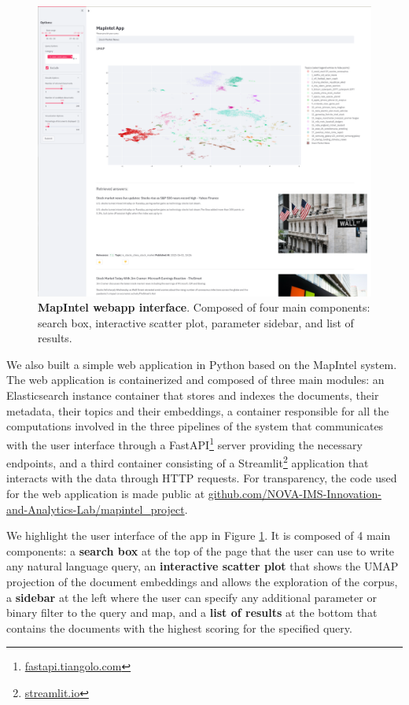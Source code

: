 \documentclass[a4paper]{article}
\begin{document}
\begin{figure}[H]
  \centering
  \includegraphics[scale=0.45]{./assets/ui_screenshot}
  \caption{\textbf{MapIntel webapp interface}. Composed of four main components: search box, interactive scatter plot, parameter sidebar, and list of results.}
  \label{app_ui}
\end{figure}

We also built a simple web application in Python based on the MapIntel system. The web application is containerized and composed of three main modules: an Elasticsearch instance container that stores and indexes the documents, their metadata, their topics and their embeddings, a container responsible for all the computations involved in the three pipelines of the system that communicates with the user interface through a FastAPI\footnote{\href{https://fastapi.tiangolo.com/}{fastapi.tiangolo.com}} server providing the necessary endpoints, and a third container consisting of a Streamlit\footnote{\href{https://streamlit.io/}{streamlit.io}} application that interacts with the data through HTTP requests. For transparency, the code used for the web application is made public at \href{https://github.com/NOVA-IMS-Innovation-and-Analytics-Lab/mapintel_project}{github.com/NOVA-IMS-Innovation-and-Analytics-Lab/mapintel\_project}.

We highlight the user interface of the app in Figure \ref{app_ui}. It is composed of 4 main components: a \textbf{search box} at the top of the page that the user can use to write any natural language query, an \textbf{interactive scatter plot} that shows the UMAP projection of the document embeddings and allows the exploration of the corpus, a \textbf{sidebar} at the left where the user can specify any additional parameter or binary filter to the query and map, and a \textbf{list of results} at the bottom that contains the documents with the highest scoring for the specified query.
\end{document}
